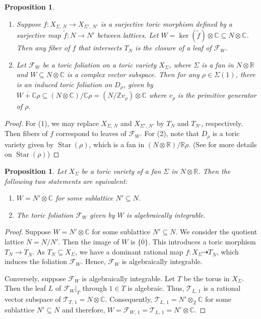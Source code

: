 \documentclass[12pt,reqno]{amsart}
\newtheorem{proposition}[theorem]{Proposition}
\theoremstyle{definition}
\newcommand{\mc}{\mathcal}
\newcommand{\mb}{\mathbb}
\newcommand{\on}{\operatorname}
\newcommand\cF{{\mathcal{F}}}
\newcommand\cT{{\mathcal{T}}}
\newcommand\bC{{\mathbb C}}
\newcommand\bR{{\mathbb R}}
\newcommand\bZ{{\mathbb Z}}
\begin{document}
\begin{proposition}\label{restriction}\hspace{1em}
\begin{enumerate}
\item Suppose $f\colon X_{\Sigma,\,N}\to X_{\Sigma',\,N'}$ is a surjective toric morphism defined by a surjective map $\tilde{f}\colon N\to N'$ between lattices. 
Let $W=\on{ker}(\tilde{f})\otimes \bC\subseteq N\otimes\bC$.
Then any fiber of $f$ that intersects $T_N$ is the closure of a leaf of $\mc F_W$. 
\item Let $\cF_W$ be a toric foliation on a toric variety $X_\Sigma$, where $\Sigma$ is a fan in $N\otimes\bR$ and $W\subseteq N\otimes\bC$ is a complex vector subspace. 
Then for any $\rho\in\Sigma(1)$, there is an induced toric foliation on $D_\rho$, given by $\overline{W+\bC\rho}\subseteq (N\otimes\bC)/\bC\rho=(N/\bZ v_\rho)\otimes\bC$ where $v_\rho$ is the primitive generator of $\rho$. 
\end{enumerate}
\end{proposition}
\begin{proof}
    For (1), we may replace $X_{\Sigma,\,N}$ and $X_{\Sigma',\,N'}$ by $T_N$ and $T_{N'}$, respectively. Then fibers of $f$ correspond to leaves of $\mc F_W$.
    For (2), note that $D_\rho$ is a toric variety given by $\on{Star}(\rho)$, which is a fan in $(N\otimes\bR)/\mb R\rho$. (See \cite[paragraph before Proposition 3.2.7]{CLS11} for more details on $\on{Star}(\rho)$)
\end{proof}

\begin{proposition}\label{alg_int_prop}
    Let $X_\Sigma$ be a toric variety of a fan $\Sigma$ in $N\otimes\bR$. 
    Then the following two statements are equivalent:
    \begin{enumerate}
        \item $W=N'\otimes\bC$ for some sublattice $N'\subseteq N$. 
        \item The toric foliation $\cF_W$ given by $W$ is algebraically integrable. 
    \end{enumerate}
\end{proposition}
\begin{proof}
    Suppose $W=N'\otimes\bC$ for some sublattice $N'\subseteq N$. 
    We consider the quotient lattice $\overline{N}=N/N'$. 
    Then the image of $W$ is $\{\overline{0}\}$. 
    This introduces a toric morphism $T_N\to T_{\overline{N}}$. 
    As $T_N\subseteq X_\Sigma$, we have a dominant rational map $f\colon X_\Sigma\dashrightarrow T_{\overline{N}}$, which induces the foliation $\cF_W$. 
    Hence, $\cF_W$ is algebraically integrable. 

    Conversely, suppose $\cF_W$ is algebraically integrable.  
    Let $T$ be the torus in $X_\Sigma$. 
    Then the leaf $L$ of $\cF_W\vert_T$ through $1\in T$ is algebraic. 
    Thus, $\cT_{L,\,1}$ is a rational vector subspace of $\cT_{T,\,1}=N\otimes\bC$. 
    Consequently, $\cT_{L,\,1}=N'\otimes_\bZ\bC$ for some sublattice $N'\subseteq N$ and therefore, $W = \cF_{W,\,1} = \cT_{L,\,1} = N'\otimes\bC$. 
\end{proof}
\end{document}
